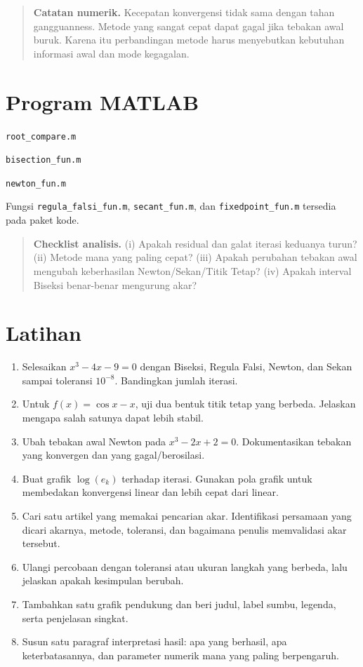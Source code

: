\documentclass[book,english,noindex,lean,nobackpage,nocopyright,noupdate,nofiglist,notablist]{enacom}
\newcommand{\Note}[1]{\begin{quote}\textbf{Catatan numerik.} #1\end{quote}}
\newcommand{\AnalysisCheck}[1]{\begin{quote}\textbf{Checklist analisis.} #1\end{quote}}
\newcommand{\MatlabFile}[1]{\par\smallskip\noindent\texttt{#1}\par}
\begin{document}
\Note{Kecepatan konvergensi tidak sama dengan tahan gangguanness. Metode yang sangat cepat dapat gagal jika tebakan awal buruk. Karena itu perbandingan metode harus menyebutkan kebutuhan informasi awal dan mode kegagalan.}

\section{Program MATLAB}
\MatlabFile{root\_compare.m}

\MatlabFile{bisection\_fun.m}

\MatlabFile{newton\_fun.m}

Fungsi \texttt{regula\_falsi\_fun.m}, \texttt{secant\_fun.m}, dan \texttt{fixedpoint\_fun.m} tersedia pada paket kode.

\AnalysisCheck{(i) Apakah residual dan galat iterasi keduanya turun? (ii) Metode mana yang paling cepat? (iii) Apakah perubahan tebakan awal mengubah keberhasilan Newton/Sekan/Titik Tetap? (iv) Apakah interval Biseksi benar-benar mengurung akar?}

\section{Latihan}
\begin{enumerate}
\item Selesaikan $x^3-4x-9=0$ dengan Biseksi, Regula Falsi, Newton, dan Sekan sampai toleransi $10^{-8}$. Bandingkan jumlah iterasi.
\item Untuk $f(x)=\cos x-x$, uji dua bentuk titik tetap yang berbeda. Jelaskan mengapa salah satunya dapat lebih stabil.
\item Ubah tebakan awal Newton pada $x^3-2x+2=0$. Dokumentasikan tebakan yang konvergen dan yang gagal/berosilasi.
\item Buat grafik $\log(e_k)$ terhadap iterasi. Gunakan pola grafik untuk membedakan konvergensi linear dan lebih cepat dari linear.
\item Cari satu artikel yang memakai pencarian akar. Identifikasi persamaan yang dicari akarnya, metode, toleransi, dan bagaimana penulis memvalidasi akar tersebut.

\item Ulangi percobaan dengan toleransi atau ukuran langkah yang berbeda, lalu jelaskan apakah kesimpulan berubah.
\item Tambahkan satu grafik pendukung dan beri judul, label sumbu, legenda, serta penjelasan singkat.
\item Susun satu paragraf interpretasi hasil: apa yang berhasil, apa keterbatasannya, dan parameter numerik mana yang paling berpengaruh.

\end{enumerate}
\end{document}
